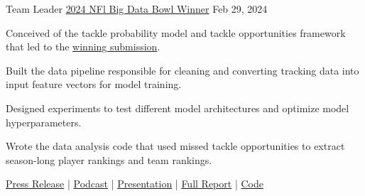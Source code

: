 

\begin{cventries}
    
\cventry
{Team Leader} %
{\href{https://operations.nfl.com/gameday/analytics/big-data-bowl/2024-big-data-bowl-winner-and-finalists/}{2024 NFl Big Data Bowl Winner}}
{} %
{Feb 29, 2024} %
{
  \begin{cvitems} %
    \item {Conceived of the tackle probability model and tackle opportunities framework that led to the \href{https://www.kaggle.com/code/matthewpchang/uncovering-missed-tackle-opportunities}{winning submission}.}
    \item {Built the data pipeline responsible for cleaning and converting tracking data into input feature vectors for model training.}
    \item {Designed experiments to test different model architectures and optimize model hyperparameters.}
    \item {Wrote the data analysis code that used missed tackle opportunities to extract season-long player rankings and team rankings.} 
    \item {\href{https://operations.nfl.com/gameday/analytics/big-data-bowl/2024-big-data-bowl-winner-and-finalists/}{Press Release} | \href{https://www.trumedianetworks.com/expected-value-podcast/2024/3/12/matt-chang-nfl-big-data-bowl-winner}{Podcast} | \href{https://www.loom.com/share/54c67d584ee34efbb799e8dbbd551091}{Presentation} | \href{https://www.kaggle.com/code/matthewpchang/uncovering-missed-tackle-opportunities}{Full Report} | \href{https://github.com/mpchang/uncovering-missed-tackle-opportunities}{Code}}
  \end{cvitems}
}



\end{cventries}

